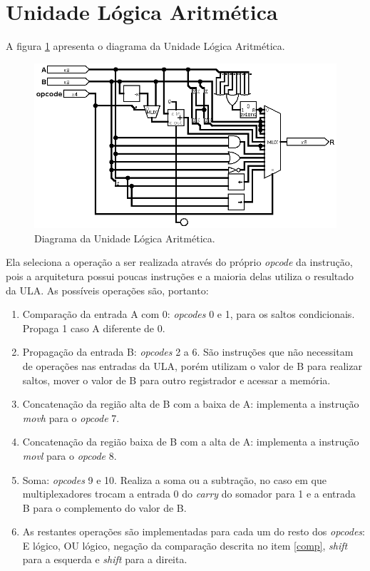 \documentclass{article}
\begin{document}
\section{Unidade Lógica Aritmética}

A figura \ref{ula} apresenta o diagrama da Unidade Lógica Aritmética.

\begin{figure}[ht]
	\centering
	\includegraphics[width=\textwidth]{alu.png}
	\caption{Diagrama da Unidade Lógica Aritmética.}
	\label{ula}
\end{figure}

Ela seleciona a operação a ser realizada através do próprio \textit{opcode} da
instrução, pois a arquitetura possui poucas instruções e a maioria delas utiliza
o resultado da ULA. As possíveis operações são, portanto:

\begin{enumerate}
	\item \label{comp} Comparação da entrada A com 0: \textit{opcodes} 0 e 1, para
	os saltos condicionais. Propaga 1 caso A diferente de 0.
	\item Propagação da entrada B: \textit{opcodes} 2 a 6. São instruções que não
	necessitam de operações nas entradas da ULA, porém utilizam o valor de B para
	realizar saltos, mover o valor de B para outro registrador e acessar a
	memória.
	\item Concatenação da região alta de B com a baixa de A: implementa a
	instrução \textit{movh} para o \textit{opcode} 7.
	\item Concatenação da região baixa de B com a alta de A: implementa a
	instrução \textit{movl} para o \textit{opcode} 8.
	\item Soma: \textit{opcodes} 9 e 10. Realiza a soma ou a subtração, no caso em
	que multiplexadores trocam a entrada 0 do \textit{carry} do somador para 1 e a
	entrada B para o complemento do valor de B.
	\item As restantes operações são implementadas para cada um do resto dos
	\textit{opcodes}: E lógico, OU lógico, negação da comparação descrita no item
	\ref{comp}, \textit{shift} para a esquerda e \textit{shift} para a direita.
\end{enumerate}
\end{document}
